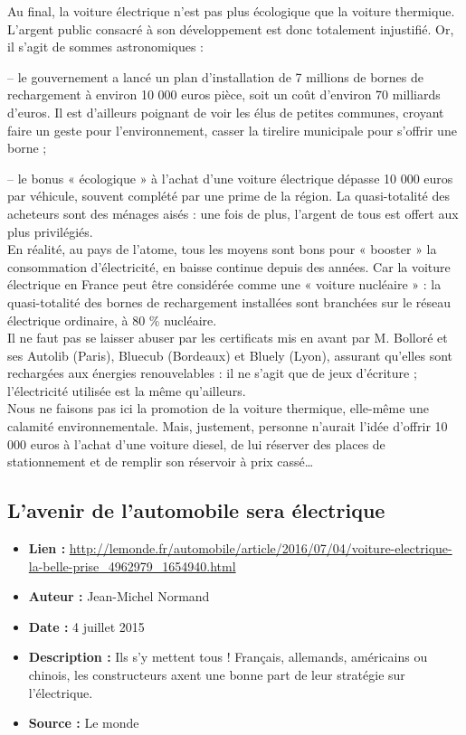 \documentclass[8pt]{article}
\begin{document}
Au final, la voiture électrique n’est pas plus écologique que la voiture thermique. L’argent public consacré à son développement est donc totalement injustifié. Or, il s’agit de sommes astronomiques : 

– le gouvernement a lancé un plan d’installation de 7 millions de bornes de rechargement à environ 10 000 euros pièce, soit un coût d’environ 70 milliards d’euros. Il est d’ailleurs poignant de voir les élus de petites communes, croyant faire un geste pour l’environnement, casser la tirelire municipale pour s’offrir une borne ;

– le bonus « écologique » à l’achat d’une voiture électrique dépasse 10 000 euros par véhicule, souvent complété par une prime de la région. La quasi-totalité des acheteurs sont des ménages aisés : une fois de plus, l’argent de tous est offert aux plus privilégiés. \\

En réalité, au pays de l’atome, tous les moyens sont bons pour « booster » la consommation d’électricité, en baisse continue depuis des années. Car la voiture électrique en France peut être considérée comme une « voiture nucléaire » : la quasi-totalité des bornes de rechargement installées sont branchées sur le réseau électrique ordinaire, à 80 \% nucléaire. \\

Il ne faut pas se laisser abuser par les certificats mis en avant par M. Bolloré et ses Autolib (Paris), Bluecub (Bordeaux) et Bluely (Lyon), assurant qu’elles sont rechargées aux énergies renouvelables : il ne s’agit que de jeux d’écriture ; l’électricité utilisée est la même qu’ailleurs. \\

Nous ne faisons pas ici la promotion de la voiture thermique, elle-même une calamité environnementale. Mais, justement, personne n’aurait l’idée d’offrir 10 000 euros à l’achat d’une voiture diesel, de lui réserver des places de stationnement et de remplir son réservoir à prix cassé…


\newpage
\subsection{L’avenir de l’automobile sera électrique}
 
\begin{itemize}
	\item \textbf{Lien : }  \url{http://lemonde.fr/automobile/article/2016/07/04/voiture-electrique-la-belle-prise_4962979_1654940.html} 
	\item \textbf{Auteur :} Jean-Michel Normand
	\item \textbf{Date : } 4 juillet 2015
	\item \textbf{Description : } Ils s’y mettent tous ! Français, allemands, américains ou chinois, les constructeurs axent une bonne part de leur stratégie sur l’électrique.
	\item \textbf{Source : } Le monde
\end{itemize}
\end{document}
